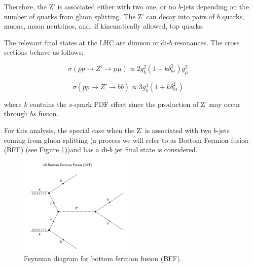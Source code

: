 Therefore, the Z' is associated either with two one, or no $b$-jets depending on the number of quarks from gluon splitting. The Z' can decay into pairs of $b$ quarks, muons, muon neutrinos, and, if kinematically allowed, top quarks. 

The relevant final states at the LHC are dimuon or di-$b$ resonances. The cross sections behave as follows:

\begin{equation}
\label{crossmu}
\sigma(pp\rightarrow Z' \rightarrow \mu\mu)\propto2g_{b}^{2}(1+k\delta_{bs}^{2})g_{\mu}^{2}
\end{equation}

\begin{equation}
\label{crossb}
\sigma(pp\rightarrow Z' \rightarrow b\bar{b})\propto3g_{b}^{4}(1+k\delta_{bs}^{2})
\end{equation}

where $k$ contains the $s$-quark PDF effect since the production of Z' may occur through $bs$ fusion.

For this analysis, the special case when the Z' is associated with two $b$-jets coming from gluon splitting (a process we will refer to as Bottom Fermion fusion (BFF) (see Figure \ref{fig:bff}))and has a di-$b$ jet final state is considered.

 \begin{figure}[h]
 	\centering
 	\includegraphics[width=0.5\textwidth]{figures/bff.png}
 	\singlespace
 	\caption{Feynman diagram for bottom fermion fusion (BFF).}
 	\label{fig:bff}
 \end{figure}


